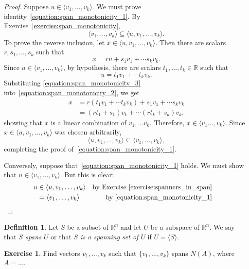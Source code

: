 \documentclass{amsart}
\newcommand{\RR}{\mathbb{R}}
\theoremstyle{definition}
\newtheorem{definition}[theorem]{Definition}
\newtheorem{exercise}[theorem]{Exercise}
\begin{document}
\begin{proof}
  Suppose $u\in \langle v_1,\ldots,v_k\rangle$.
  We must prove identity~\eqref{equation:span_monotonicity_1}.
  By Exercise~\ref{exercise:span_monotonicity}, 
$$\langle v_1,\ldots,v_k\rangle \subseteq \langle u, v_1,\ldots,v_k\rangle.$$
To prove the reverse inclusion, let $x\in \langle u, v_1,\ldots,v_k\rangle$.
Then there are scalars $r,s_1,\ldots,s_k$ such that
\begin{equation}\label{equation:span_monotonicity_2}
x=ru+s_1v_1+\cdots s_kv_k.
\end{equation}
Since $u\in \langle v_1,\ldots,v_k\rangle$, by hypothesis, there are scalars $t_1,\ldots,t_k\in\RR$ such that
\begin{equation}\label{equation:span_monotonicity_3}
u=t_1v_1+\cdots t_kv_k.
\end{equation}
Substituting \eqref{equation:span_monotonicity_3} into~\eqref{equation:span_monotonicity_2}, we get
\begin{align*}
x &= r(t_1v_1+\cdots t_kv_k)+s_1v_1+\cdots s_kv_k\\
&=(rt_1+s_1)v_1+\cdots (rt_k+s_k)v_k.
\end{align*}
showing that $x$ is a linear combination of $v_1,\ldots v_k$.
Therefore, $x\in \langle v_1\ldots,v_k\rangle$.
Since $x\in \langle u, v_1,\ldots,v_k\rangle$ was chosen arbitrarily,
$$
\langle u, v_1,\ldots,v_k\rangle
\subseteq \langle v_1,\ldots,v_k\rangle,
$$
completing the proof of~\eqref{equation:span_monotonicity_1}.

Conversely, suppose that~\eqref{equation:span_monotonicity_1} holds.
We must show that $u\in\langle v_1,\ldots,v_k\rangle$. But this is clear:
\begin{align*}
  u&\in \langle u,v_1,\ldots,v_k\rangle & \text{by Exercise~\ref{exercise:spanners_in_span}}\\
  &=\langle v_1,\ldots,v_k\rangle &\text{by~\eqref{equation:span_monotonicity_1}} &\qedhere
\end{align*}
\end{proof}


\begin{definition}
  Let $S$ be a subset of $\RR^n$ and let $U$ be a subspace of $\RR^n$.
We say that \emph{$S$ spans $U$} or that \emph{$S$ is a spanning set of $U$} if $U=\langle S\rangle$.
\end{definition}

\begin{exercise}
Find vectors $v_1,\ldots,v_k$ such that $\{v_1,\ldots,v_k\}$ spans $N(A)$, where $A=...$.
\end{exercise}
\end{document}

